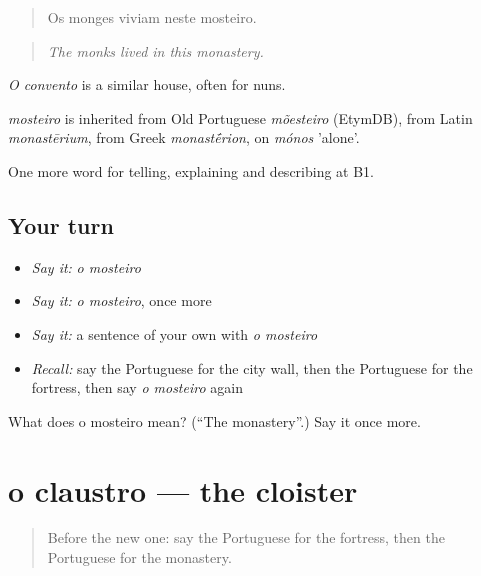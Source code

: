 \begin{quote}
Os monges viviam neste mosteiro.
\end{quote}

\begin{quote}
\emph{The monks lived in this monastery.}
\end{quote}

\emph{O convento} is a similar house, often for nuns.

\begin{cousinweb}
\emph{mosteiro} is inherited from Old Portuguese \emph{mõesteiro} (EtymDB), from Latin \emph{monastērium}, from Greek \emph{monast\'{\={e}}rion}, on \emph{mónos} 'alone'.
\end{cousinweb}

\begin{grammarlens}[title={What you've built}]
One more word for telling, explaining and describing at B1.
\end{grammarlens}

\subsection*{Your turn}
\begin{itemize}
\raggedright
  \item \emph{Say it:} \emph{o mosteiro}
  \item \emph{Say it:} \emph{o mosteiro}, once more
  \item \emph{Say it:} a sentence of your own with \emph{o mosteiro}
  \item \emph{Recall:} say the Portuguese for the city wall, then the Portuguese for the fortress, then say \emph{o mosteiro} again
\end{itemize}

\begin{tcolorbox}[breakable,colback=teal!4,colframe=teal!35!black,title={Before you move on}]
What does o mosteiro mean? (\textquotedblleft{}The monastery\textquotedblright{}.) Say it once more.
\end{tcolorbox}
\section[o claustro]{o claustro — the cloister}

\label{lesson:PT-C442-claustro}



\begin{quote}
Before the new one: say the Portuguese for the fortress, then the Portuguese for the monastery.
\end{quote}

